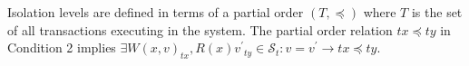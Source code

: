 \documentclass[acmlarge, ,11pt]{acmart}
\begin{document}
 Isolation levels are defined in terms of a partial order $\left( T, \preccurlyeq \right)$ 
 where $T$ is the set of all transactions executing in the system.   %
The partial order relation $\mathit{tx} \preccurlyeq \mathit{ty}$ in Condition 2 %
  implies  $\exists W(x,v)_{\mathit{tx}}, R(x){v^{'}}_{\mathit{ty}} \in  \mathcal{S}_t: %
   v = v^{'}  \rightarrow \mathit{tx} \preccurlyeq \mathit{ty}$. 
\end{document}

